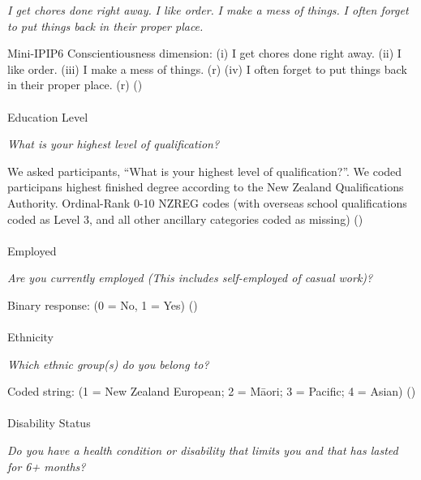 \documentclass[
  single column]{article}
\makeatletter
\let\oldparagraph\paragraph
\renewcommand{\paragraph}{
    \@ifstar
      \xxxParagraphStar
      \xxxParagraphNoStar
  }
\newcommand{\xxxParagraphStar}[1]{\oldparagraph*{#1}\mbox{}}
\newcommand{\xxxParagraphNoStar}[1]{\oldparagraph{#1}\mbox{}}
\makeatother
\begin{document}
\emph{I get chores done right away.} \emph{I like order.} \emph{I make a
mess of things.} \emph{I often forget to put things back in their proper
place.}

Mini-IPIP6 Conscientiousness dimension: (i) I get chores done right
away. (ii) I like order. (iii) I make a mess of things. (r) (iv) I often
forget to put things back in their proper place. (r)
()

\paragraph{Education Level}\label{education-level}

\emph{What is your highest level of qualification?}

We asked participants, ``What is your highest level of qualification?''.
We coded participans highest finished degree according to the New
Zealand Qualifications Authority. Ordinal-Rank 0-10 NZREG codes (with
overseas school qualifications coded as Level 3, and all other ancillary
categories coded as missing) ()

\paragraph{Employed}\label{employed}

\emph{Are you currently employed (This includes self-employed of casual
work)?}

Binary response: (0 = No, 1 = Yes)
()

\paragraph{Ethnicity}\label{ethnicity}

\emph{Which ethnic group(s) do you belong to?}

Coded string: (1 = New Zealand European; 2 = Māori; 3 = Pacific; 4 =
Asian) ()

\paragraph{Disability Status}\label{disability-status}

\emph{Do you have a health condition or disability that limits you and
that has lasted for 6+ months?}
\end{document}
